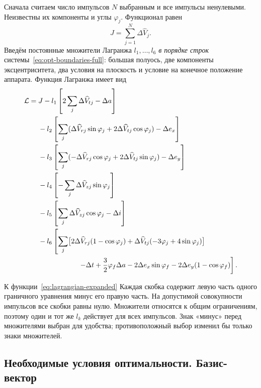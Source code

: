 Сначала считаем число импульсов $N$ выбранным и все импульсы
ненулевыми. Неизвестны их компоненты и углы $\varphi_j$.
Функционал равен
\begin{equation}
 J=\sum_{j=1}^N\Delta\widehat V_j.
 \label{eq:opt-cost}
\end{equation}
Введём постоянные множители Лагранжа $l_1,\ldots,l_6$
\emph{в порядке строк} системы~\eqref{eq:opt-boundaries-full}:
большая полуось, две компоненты эксцентриситета, два условия
на плоскость и условие на конечное положение аппарата. Функция Лагранжа имеет вид
\begin{equation}
\begin{aligned}
 \mathcal L={}&J-l_1\left[2\sum_j\Delta\widehat V_{tj}-\Delta a\right]\\
 &-l_2\left[\sum_j(\Delta\widehat V_{rj}\sin\varphi_j+
                    2\Delta\widehat V_{tj}\cos\varphi_j)-\Delta e_x\right]\\
 &-l_3\left[\sum_j(-\Delta\widehat V_{rj}\cos\varphi_j+
                    2\Delta\widehat V_{tj}\sin\varphi_j)-\Delta e_y\right]\\
 &-l_4\left[-\sum_j\Delta\widehat V_{zj}\sin\varphi_j\right]\\
 &-l_5\left[\sum_j\Delta\widehat V_{zj}\cos\varphi_j
                    -\Delta i\right]\\
 &-l_6\left[\sum_j\bigl[2\Delta\widehat V_{rj}(1-\cos\varphi_j)
       +\Delta\widehat V_{tj}(-3\varphi_j+4\sin\varphi_j)\bigr]\right.\\
 &\hspace{20mm}\left.-\Delta t+\frac32\varphi_f\Delta a
         -2\Delta e_x\sin\varphi_f-2\Delta e_y(1-\cos\varphi_f)\right].
\end{aligned}
\label{eq:lagrangian-expanded}
\end{equation}
\begin{explanation}{К функции~\eqref{eq:lagrangian-expanded}}
Каждая скобка содержит левую часть одного граничного уравнения
минус его правую часть. На допустимой совокупности импульсов
все скобки равны нулю. Множители относятся к общим ограничениям,
поэтому один и тот же $l_k$ действует для всех импульсов.
Знак «минус» перед множителями выбран для удобства;
противоположный выбор изменил бы только знаки множителей.
\end{explanation}

\subsection{Необходимые условия оптимальности. Базис-вектор}

